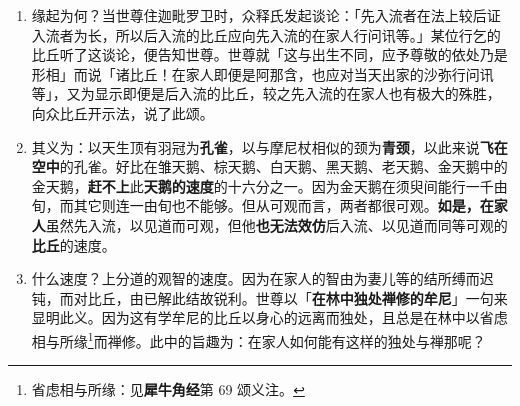 \begin{enumerate}\item 缘起为何？当世尊住迦毗罗卫时，众释氏发起谈论：「先入流者在法上较后证入流者为长，所以后入流的比丘应向先入流的在家人行问讯等。」某位行乞的比丘听了这谈论，便告知世尊。世尊就「这与出生不同，应予尊敬的依处乃是形相」而说「诸比丘！在家人即便是阿那含，也应对当天出家的沙弥行问讯等」，又为显示即便是后入流的比丘，较之先入流的在家人也有极大的殊胜，向众比丘开示法，说了此颂。
\item 其义为：以天生顶有羽冠为\textbf{孔雀}，以与摩尼杖相似的颈为\textbf{青颈}，以此来说\textbf{飞在空中}的孔雀。好比在雏天鹅、棕天鹅、白天鹅、黑天鹅、老天鹅、金天鹅中的金天鹅，\textbf{赶不上}此\textbf{天鹅的速度}的十六分之一。因为金天鹅在须臾间能行一千由旬，而其它则连一由旬也不能够。但从可观而言，两者都很可观。\textbf{如是，在家人}虽然先入流，以见道而可观，但他\textbf{也无法效仿}后入流、以见道而同等可观的\textbf{比丘}的速度。
\item 什么速度？上分道的观智的速度。因为在家人的智由为妻儿等的结所缚而迟钝，而对比丘，由已解此结故锐利。世尊以「\textbf{在林中独处禅修的牟尼}」一句来显明此义。因为这有学牟尼的比丘以身心的远离而独处，且总是在林中以省虑相与所缘\footnote{省虑相与所缘：见\textbf{犀牛角经}第 69 颂义注。}而禅修。此中的旨趣为：在家人如何能有这样的独处与禅那呢？\end{enumerate}